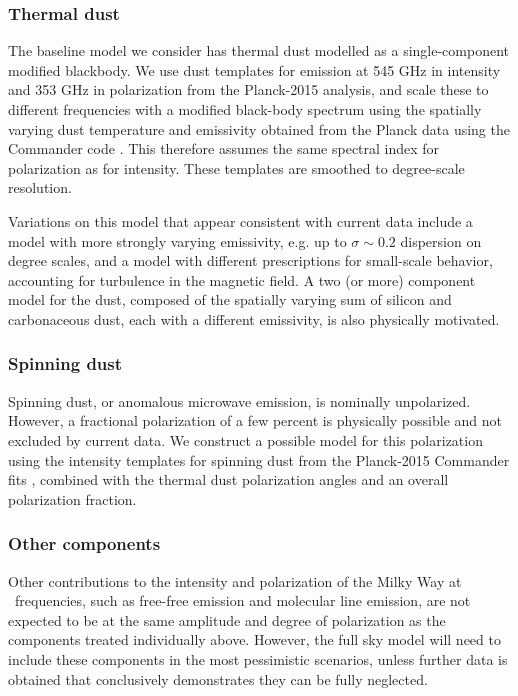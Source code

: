 \subsubsection{Thermal dust}
The baseline model we consider has thermal dust modelled as a single-component modified  blackbody. We use dust templates for emission at 545 GHz in intensity and 
 353 GHz in polarization from the Planck-2015 analysis, and scale these to different  frequencies with a modified black-body spectrum using the spatially varying dust temperature and emissivity obtained from the Planck data using the Commander code \cite{Adam:2015wua}. This therefore assumes the same spectral index for  polarization as for intensity.  These templates are smoothed to degree-scale resolution.

Variations on this model that appear consistent with current data include a model with more strongly varying emissivity, e.g. up to $\sigma \sim 0.2$ dispersion on degree scales, and a model with different prescriptions for small-scale behavior, accounting for turbulence in the magnetic field. A two (or more) component model for the dust, composed of the spatially varying sum of silicon and carbonaceous dust, each with a different emissivity, is also physically motivated.

\subsubsection{Spinning dust}
Spinning dust, or anomalous microwave emission, is nominally unpolarized. However, a fractional polarization of a few percent is physically possible and not excluded by current data. We construct a possible model for this polarization using the intensity templates for spinning dust from the Planck-2015 Commander fits
\cite{Adam:2015wua}, combined with the thermal dust polarization angles and an overall polarization fraction.



\subsubsection{Other components}
Other contributions to the intensity and polarization of the Milky Way at \cmbexp\ frequencies, such as 
free-free emission and molecular line emission, are not expected to be at the same amplitude and degree
of polarization as the components treated individually above. However, the full sky model will need to include
these components in the most pessimistic scenarios, unless further data is obtained that 
conclusively demonstrates they can be fully neglected.

